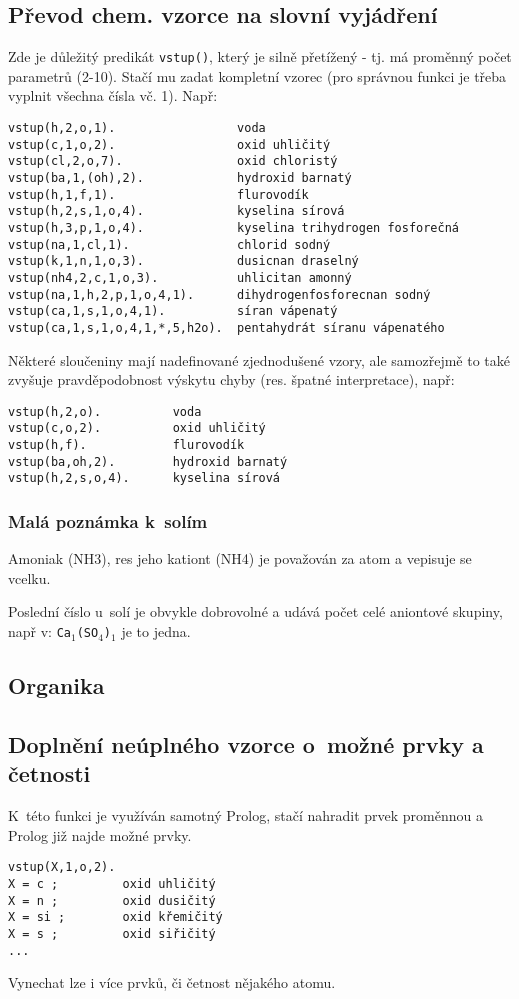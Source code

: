 \documentclass[a4paper]{article}
\begin{document}
\subsection{Převod chem. vzorce na slovní vyjádření}
Zde je důležitý predikát \texttt{vstup()}, který je silně přetížený - tj. má proměnný počet parametrů (2-10). Stačí mu zadat kompletní vzorec (pro správnou funkci je třeba vyplnit všechna čísla vč. 1). Např:
\begin{verbatim}
vstup(h,2,o,1).                 voda
vstup(c,1,o,2).                 oxid uhličitý
vstup(cl,2,o,7).                oxid chloristý
vstup(ba,1,(oh),2).             hydroxid barnatý
vstup(h,1,f,1).                 flurovodík
vstup(h,2,s,1,o,4).             kyselina sírová
vstup(h,3,p,1,o,4).             kyselina trihydrogen fosforečná
vstup(na,1,cl,1).               chlorid sodný
vstup(k,1,n,1,o,3).             dusicnan draselný
vstup(nh4,2,c,1,o,3).           uhlicitan amonný
vstup(na,1,h,2,p,1,o,4,1).      dihydrogenfosforecnan sodný
vstup(ca,1,s,1,o,4,1).          síran vápenatý
vstup(ca,1,s,1,o,4,1,*,5,h2o).  pentahydrát síranu vápenatého
\end{verbatim}
Některé sloučeniny mají nadefinované zjednodušené vzory, ale samozřejmě to také zvyšuje pravděpodobnost výskytu chyby (res. špatné interpretace), např:
\begin{verbatim}
vstup(h,2,o).          voda
vstup(c,o,2).          oxid uhličitý
vstup(h,f).            flurovodík
vstup(ba,oh,2).        hydroxid barnatý
vstup(h,2,s,o,4).      kyselina sírová
\end{verbatim}
\subsubsection{Malá poznámka k~solím}
Amoniak (NH3), res jeho kationt (NH4) je považován za atom a vepisuje se vcelku.

Poslední číslo u~solí je obvykle dobrovolné a udává počet celé aniontové skupiny, např v: \texttt{Ca$_1$(SO$_4$)$_1$} je to jedna.
\subsection{Organika}
\subsection{Doplnění neúplného vzorce o~možné prvky a četnosti}
K~této funkci je využíván samotný Prolog, stačí nahradit prvek proměnnou a Prolog již najde možné prvky.
\begin{verbatim}
vstup(X,1,o,2).
X = c ;         oxid uhličitý
X = n ;         oxid dusičitý
X = si ;        oxid křemičitý
X = s ;         oxid siřičitý
...
\end{verbatim}
Vynechat lze i více prvků, či četnost nějakého atomu.
\end{document}
